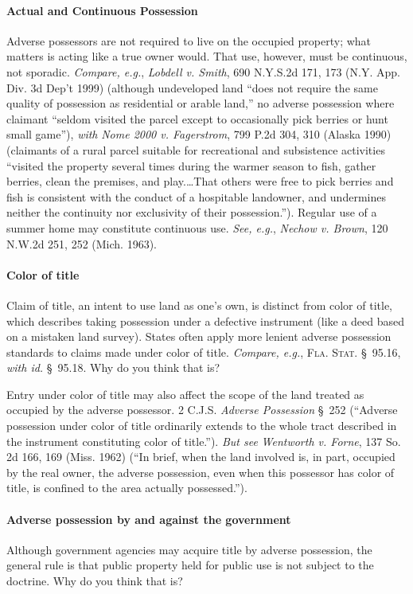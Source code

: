 \paragraph{Actual and Continuous Possession} Adverse possessors are
not required to live on the occupied property; what matters is acting like a
true owner would. That use, however, must be continuous, not sporadic.
\textit{Compare, e.g.}, \emph{Lobdell v. Smith}, 690 N.Y.S.2d 171, 173 (N.Y.
App. Div.
3d Dep't 1999) (although undeveloped land ``does not require the same quality
of possession as residential or arable land,'' no adverse possession where
claimant ``seldom visited the parcel except to occasionally pick berries or
hunt small game''), \textit{with} \emph{Nome 2000 v. Fagerstrom}, 799 P.2d 304,
310
(Alaska 1990) (claimants of a rural parcel suitable for recreational and
subsistence activities ``visited the property several times during the warmer
season to fish, gather berries, clean the premises, and play.\ldots That
others were free to pick berries and fish is consistent with the conduct of a
hospitable landowner, and undermines neither the continuity nor exclusivity of
their possession.''). Regular use of a summer home may constitute continuous
use. \textit{See, e.g.}, \emph{Nechow v. Brown}, 120 N.W.2d 251, 252 (Mich.
1963).

\paragraph{Color of title} Claim of title, an intent to use land as one's
own, is distinct from color of title, which describes taking possession under a
defective instrument (like a deed based on a mistaken land survey). States
often apply more lenient adverse possession standards to claims made under
color of title. \textit{Compare, e.g.}, \textsc{Fla. Stat.} \S~95.16,
\textit{with id.} \S~95.18. Why do you think that is? 

Entry under color of title may also affect the scope of the land treated as
occupied by the adverse possessor. 2 C.J.S. \textit{Adverse Possession} \S~252
(``Adverse possession under color of title ordinarily extends to the whole
tract described in the instrument constituting color of title.''). \textit{But
see} \emph{Wentworth v. Forne}, 137 So. 2d 166, 169 (Miss. 1962) (``In brief, when the
land involved is, in part, occupied by the real owner, the adverse possession,
even when this possessor has color of title, is confined to the area actually
possessed.'').

\paragraph{Adverse possession by and against the government}
Although government agencies may acquire title by adverse possession, the
general rule is that public property held for public use is not subject to the
doctrine. Why do you think that is?

